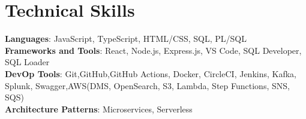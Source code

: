 \documentclass[letterpaper,11pt]{article}
\begin{document}
	\section{Technical Skills}
	\begin{itemize}[leftmargin=0.15in, label={}]
		\small{\item{
				\textbf{Languages}{: JavaScript, TypeScript, HTML/CSS, SQL, PL/SQL} \\
				\textbf{Frameworks and Tools}{: React,  Node.js, Express.js, VS Code, SQL Developer, SQL Loader} \\
				\textbf{DevOp Tools}{: Git,GitHub,GitHub Actions, Docker, CircleCI, Jenkins, Kafka, Splunk, Swagger,AWS(DMS, OpenSearch, S3, Lambda, Step Functions, SNS, SQS)} \\
				\textbf{Architecture Patterns}{: Microservices, Serverless}\\
				
		}}
	\end{itemize}
	
	
\end{document}
